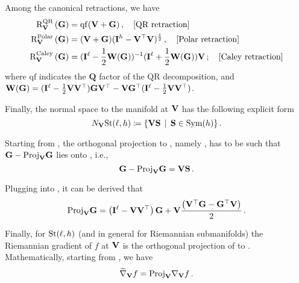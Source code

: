 Among the canonical retractions, we have 
\begin{equation}\label{eq:stiefel_retractions}
    \begin{aligned}
        \mathrm{R}^{\mathrm{QR}}_{\mathbf{V}}\left( \mathbf{G} \right) &= \mathrm{qf}(\mathbf{V} + \mathbf{G})\,, \quad \text{[QR retraction]}\\
        \mathrm{R}^{\mathrm{Polar}}_{\mathbf{V}}\left( \mathbf{G} \right) &= (\mathbf{V} + \mathbf{G})(\mathbf{I}^h - \mathbf{V}^\top \mathbf{V})^{\frac{1}{2}}\,, \quad \text{[Polar retraction]}\\
        \mathrm{R}^{\mathrm{Caley}}_{\mathbf{V}}\left( \mathbf{G} \right) &= (\mathbf{I}^\ell -\frac{1}{2}\mathbf{W}(\mathbf{G}))^{-1}(\mathbf{I}^\ell +\frac{1}{2}\mathbf{W}(\mathbf{G}))\mathbf{V} \,; \quad \text{[Caley retraction]}
    \end{aligned}
\end{equation}
where $\mathrm{qf}$ indicates the $\mathbf{Q}$ factor of the $\mathrm{QR}$ decomposition, and $\mathbf{W}(\mathbf{G})=(\mathbf{I}^\ell - \frac{1}{2}\mathbf{V}\mathbf{V}^\top)\mathbf{G} \mathbf{V}^\top- \mathbf{V}\mathbf{G}^\top (\mathbf{I}^\ell - \frac{1}{2}\mathbf{V}\mathbf{V}^\top)$. 

Finally, the normal space to the manifold at $\mathbf{V}$ has the following explicit form
\begin{equation}\label{eq:explicit_normal_space}
    N_{\mathbf{V}}{\mathrm{St}({\ell},{h})}\coloneqq \{ \mathbf{V} \mathbf{S} \, \mid \, \mathbf{S} \in \mathrm{Sym}({h}) \}\,.
\end{equation}

Starting from , the orthogonal projection to , namely \projectiontangentspace{\V}{}, has to be such that $\mathbf{G} - \mathrm{Proj}_{\mathbf{V}}{\mathbf{G}}$ lies onto , i.e.,
\begin{equation}\label{eq:stiefel_proj_diff}
    \mathbf{G} - \mathrm{Proj}_{\mathbf{V}}{\mathbf{G}} = \mathbf{V} \mathbf{S}\,.
\end{equation}

Plugging  into , it can be derived that
\begin{equation}\label{eq:stiefel_projection}
    \mathrm{Proj}_{\mathbf{V}}{\mathbf{G}} = \left(\mathbf{I}^\ell - \mathbf{V} \mathbf{V}^{\top} \right) \mathbf{G} + \mathbf{V} \frac{ \left(\mathbf{V}^{\top} \mathbf{G} - \mathbf{G}^\top \mathbf{V} \right)}{2} \,.
\end{equation}

Finally, for $\mathrm{St}({\ell},{h})$ (and in general for Riemannian submanifolds) the Riemannian gradient of $f$ at $\mathbf{V}$ is the orthogonal projection of  to .
Mathematically, starting from , we have 
\begin{equation}\label{eq:stiefel_grad}
    \widetilde{\nabla}_{\mathbf{V}} f=\mathrm{Proj}_{\mathbf{V}}{\nabla_{\mathbf{V}} f} \,.    
\end{equation}